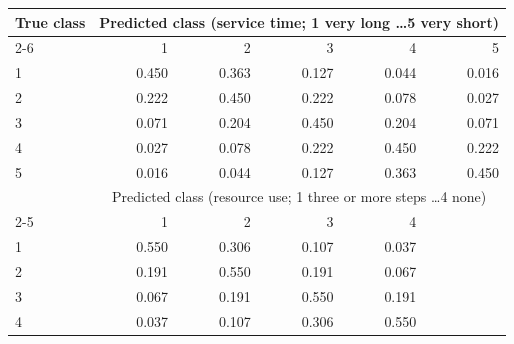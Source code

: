 \begin{tabular}{lrrrrr}
\toprule
True class & \multicolumn{5}{c}{Predicted class (service time; 1 very long \dots 5 very short)} \\
\cmidrule(lr){2-6}
 & 1 & 2 & 3 & 4 & 5 \\
\midrule
1 & 0.450 & 0.363 & 0.127 & 0.044 & 0.016 \\
2 & 0.222 & 0.450 & 0.222 & 0.078 & 0.027 \\
3 & 0.071 & 0.204 & 0.450 & 0.204 & 0.071 \\
4 & 0.027 & 0.078 & 0.222 & 0.450 & 0.222 \\
5 & 0.016 & 0.044 & 0.127 & 0.363 & 0.450 \\
\midrule
 & \multicolumn{5}{c}{Predicted class (resource use; 1 three or more steps \dots 4 none)} \\
\cmidrule(lr){2-5}
 & 1 & 2 & 3 & 4 & \\
\midrule
1 & 0.550 & 0.306 & 0.107 & 0.037 & \\
2 & 0.191 & 0.550 & 0.191 & 0.067 & \\
3 & 0.067 & 0.191 & 0.550 & 0.191 & \\
4 & 0.037 & 0.107 & 0.306 & 0.550 & \\
\bottomrule
\end{tabular}